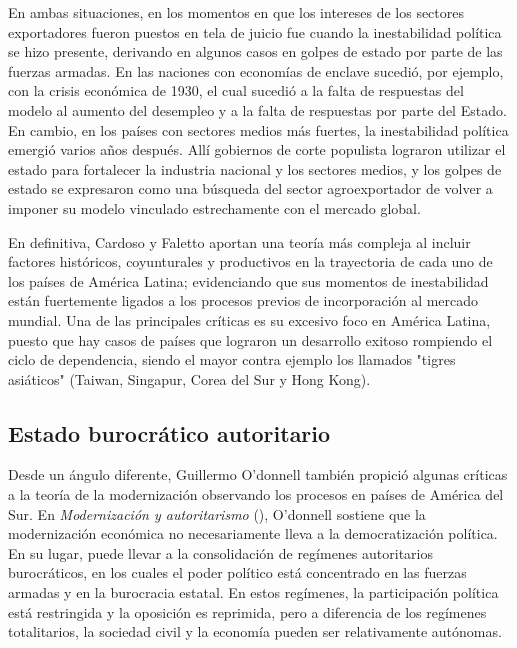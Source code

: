 \documentclass{article}
\begin{document}
En ambas situaciones, en los momentos en que los intereses de los sectores exportadores
fueron puestos en tela de juicio fue cuando la inestabilidad política se hizo presente, 
derivando en algunos casos en golpes de estado por parte de las fuerzas armadas. En las
naciones con economías de enclave sucedió, por ejemplo, con la crisis económica de 1930,
el cual sucedió a la falta de respuestas del modelo al aumento del desempleo y a la 
falta de respuestas por parte del Estado. En cambio,
en los países con sectores medios más fuertes, la inestabilidad política emergió varios
años después. Allí gobiernos de corte populista lograron utilizar el estado para fortalecer
la industria nacional y los sectores medios, y los golpes de estado se expresaron como
una búsqueda del sector agroexportador de volver a imponer su modelo vinculado estrechamente
con el mercado global.

En definitiva, Cardoso y Faletto aportan una teoría más compleja al incluir factores
históricos, coyunturales y productivos en la trayectoria de cada uno de los países de 
América Latina; evidenciando que sus momentos de inestabilidad están fuertemente ligados
a los procesos previos de incorporación al mercado mundial. Una de las principales críticas
es su excesivo foco en América Latina, puesto que hay casos de países que lograron un 
desarrollo exitoso rompiendo el ciclo de dependencia, siendo el mayor contra ejemplo los
llamados "tigres asiáticos" (Taiwan, Singapur, Corea del Sur y Hong Kong).

\subsection{Estado burocrático autoritario}

Desde un ángulo diferente, Guillermo O'donnell también propició algunas críticas a la 
teoría de la modernización observando los procesos en países de América del Sur. 
En \textit{Modernización y autoritarismo} (\citeyear{o1972modernizacion}), O'donnell
sostiene que la modernización económica no necesariamente lleva a la democratización
política. En su lugar, puede llevar a la consolidación de regímenes autoritarios
burocráticos, en los cuales el poder político está concentrado en las fuerzas armadas
y en la burocracia estatal. En estos regímenes, la participación política está
restringida y la oposición es reprimida, pero a diferencia de los regímenes totalitarios,
la sociedad civil y la economía pueden ser relativamente autónomas.
\end{document}
